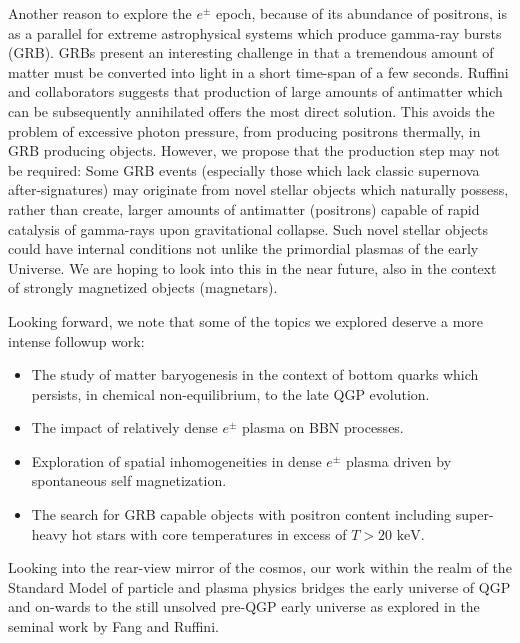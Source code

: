 \documentclass[universe,article,submit,moreauthors,pdftex,a4paper]{Definitions/mdpi}
\newcommand{\keV}{\text{ keV}}
\begin{document}
Another reason to explore the $e^{\pm}$ epoch, because of its abundance of positrons, is as a parallel for extreme astrophysical systems which produce gamma-ray bursts (GRB). GRBs present an interesting challenge in that a tremendous amount of matter \cite{Aksenov:2010vi} must be converted into light in a short time-span of a few seconds. Ruffini and collaborators \cite{Ruffini:2001fe,Ruffini:2003yt,Ruffini:2009hg,Aksenov:2008zz,Ruffini:2012it,Han:2011er} suggests that  production of large amounts of antimatter which can be subsequently annihilated offers the most direct solution. This avoids the problem of excessive photon pressure, from producing positrons thermally, in GRB producing objects. However, we propose that the production step may  not be required: Some GRB events (especially those which lack classic supernova after-signatures) \cite{Burns:2023oxn,Levan:2023doz} may originate from novel stellar objects which naturally possess, rather than create, larger amounts of antimatter (positrons) capable of rapid catalysis of gamma-rays upon gravitational collapse. Such novel stellar objects could have internal conditions not unlike the primordial plasmas of the early Universe. We are hoping to look into this in the near future, also in the context of strongly magnetized objects (magnetars).

Looking forward, we note that some of the topics we explored deserve a more intense followup work: 
\begin{itemize}
    \item The study of matter baryogenesis in the context of bottom quarks which persists, in chemical non-equilibrium, to the late QGP evolution.
    \item The impact of relatively dense $e^{\pm}$ plasma on BBN processes.
    \item Exploration of spatial inhomogeneities in dense $e^{\pm}$ plasma driven by spontaneous self magnetization.
    \item The search for GRB capable objects with positron content including super-heavy hot stars with core temperatures in excess of $T>20\keV$.
\end{itemize}

Looking into the rear-view mirror of the cosmos, our work within the realm of the Standard Model of particle and plasma physics bridges the early universe of QGP and on-wards to the still unsolved pre-QGP early universe as explored in the seminal work by Fang and Ruffini.
\end{document}
